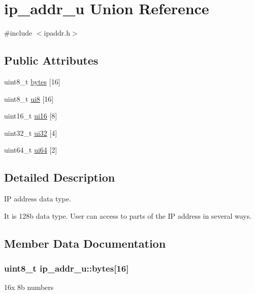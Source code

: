 \hypertarget{unionip__addr__u}{}\section{ip\+\_\+addr\+\_\+u Union Reference}
\label{unionip__addr__u}


{\ttfamily \#include $<$ipaddr.\+h$>$}

\subsection*{Public Attributes}
\begin{DoxyCompactItemize}
\item 
uint8\+\_\+t \hyperlink{unionip__addr__u_a096a9f4c0c9499e1a049b08243a13908}{bytes} \mbox{[}16\mbox{]}
\item 
uint8\+\_\+t \hyperlink{unionip__addr__u_ab172cac802c588284f773c6da88271ba}{ui8} \mbox{[}16\mbox{]}
\item 
uint16\+\_\+t \hyperlink{unionip__addr__u_acd437caca826ba90dd3b5a6f6d2427a2}{ui16} \mbox{[}8\mbox{]}
\item 
uint32\+\_\+t \hyperlink{unionip__addr__u_a57b30c62aeb608de1bef3f8b6f3900e3}{ui32} \mbox{[}4\mbox{]}
\item 
uint64\+\_\+t \hyperlink{unionip__addr__u_ae9423bb3b0d2205c26452ee60c424e87}{ui64} \mbox{[}2\mbox{]}
\end{DoxyCompactItemize}


\subsection{Detailed Description}
IP address data type.

It is 128b data type. User can access to parts of the IP address in several ways. 

\subsection{Member Data Documentation}
\subsubsection[{\texorpdfstring{bytes}{bytes}}]{\setlength{\rightskip}{0pt plus 5cm}uint8\+\_\+t ip\+\_\+addr\+\_\+u\+::bytes\mbox{[}16\mbox{]}}\hypertarget{unionip__addr__u_a096a9f4c0c9499e1a049b08243a13908}{}\label{unionip__addr__u_a096a9f4c0c9499e1a049b08243a13908}
16x 8b numbers 
